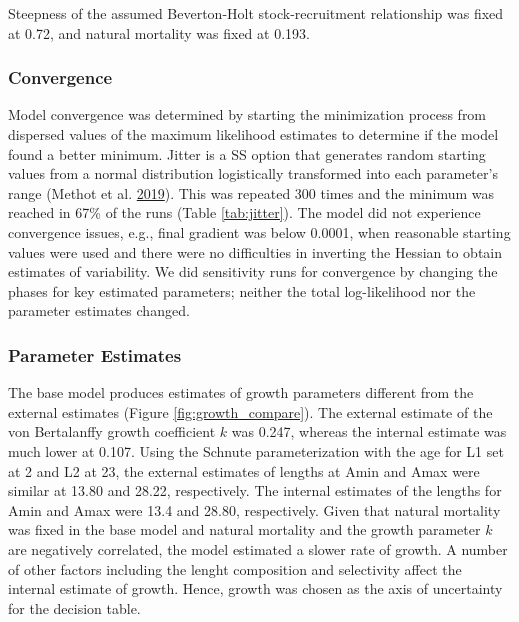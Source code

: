 \documentclass[12pt,]{article}
\begin{document}
Steepness of the assumed Beverton-Holt stock-recruitment relationship
was fixed at 0.72, and natural mortality was fixed at 0.193.

\subsubsection{Convergence}\label{convergence}

Model convergence was determined by starting the minimization process
from dispersed values of the maximum likelihood estimates to determine
if the model found a better minimum. Jitter is a SS option that
generates random starting values from a normal distribution logistically
transformed into each parameter's range (Methot et al.
\protect\hyperlink{ref-Methot2019}{2019}). This was repeated 300 times
and the minimum was reached in 67\% of the runs (Table
\ref{tab:jitter}). The model did not experience convergence issues,
e.g., final gradient was below 0.0001, when reasonable starting values
were used and there were no difficulties in inverting the Hessian to
obtain estimates of variability. We did sensitivity runs for convergence
by changing the phases for key estimated parameters; neither the total
log-likelihood nor the parameter estimates changed.

\subsubsection{Parameter Estimates}\label{parameter-estimates}

The base model produces estimates of growth parameters different from
the external estimates (Figure \ref{fig:growth_compare}). The external
estimate of the von Bertalanffy growth coefficient \(k\) was 0.247,
whereas the internal estimate was much lower at 0.107. Using the Schnute
parameterization with the age for L1 set at 2 and L2 at 23, the external
estimates of lengths at Amin and Amax were similar at 13.80 and 28.22,
respectively. The internal estimates of the lengths for Amin and Amax
were 13.4 and 28.80, respectively. Given that natural mortality was
fixed in the base model and natural mortality and the growth parameter
\(k\) are negatively correlated, the model estimated a slower rate of
growth. A number of other factors including the lenght composition and
selectivity affect the internal estimate of growth. Hence, growth was
chosen as the axis of uncertainty for the decision table.
\end{document}
